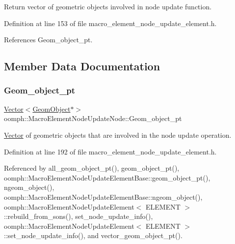 Return vector of geometric objects involved in node update function. 



Definition at line 153 of file macro\+\_\+element\+\_\+node\+\_\+update\+\_\+element.\+h.



References Geom\+\_\+object\+\_\+pt.



\subsection{Member Data Documentation}
\mbox{\label{classoomph_1_1MacroElementNodeUpdateNode_ab387f86ea45654eacc37c5f69127dc02}} 
\subsubsection{\texorpdfstring{Geom\+\_\+object\+\_\+pt}{Geom\_object\_pt}}
{\footnotesize\ttfamily \hyperlink{classoomph_1_1Vector}{Vector}$<$\hyperlink{classoomph_1_1GeomObject}{Geom\+Object}$\ast$$>$ oomph\+::\+Macro\+Element\+Node\+Update\+Node\+::\+Geom\+\_\+object\+\_\+pt\hspace{0.3cm}{\ttfamily [private]}}



\hyperlink{classoomph_1_1Vector}{Vector} of geometric objects that are involved in the node update operation. 



Definition at line 192 of file macro\+\_\+element\+\_\+node\+\_\+update\+\_\+element.\+h.



Referenced by all\+\_\+geom\+\_\+object\+\_\+pt(), geom\+\_\+object\+\_\+pt(), oomph\+::\+Macro\+Element\+Node\+Update\+Element\+Base\+::geom\+\_\+object\+\_\+pt(), ngeom\+\_\+object(), oomph\+::\+Macro\+Element\+Node\+Update\+Element\+Base\+::ngeom\+\_\+object(), oomph\+::\+Macro\+Element\+Node\+Update\+Element$<$ E\+L\+E\+M\+E\+N\+T $>$\+::rebuild\+\_\+from\+\_\+sons(), set\+\_\+node\+\_\+update\+\_\+info(), oomph\+::\+Macro\+Element\+Node\+Update\+Element$<$ E\+L\+E\+M\+E\+N\+T $>$\+::set\+\_\+node\+\_\+update\+\_\+info(), and vector\+\_\+geom\+\_\+object\+\_\+pt().

